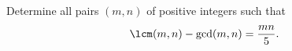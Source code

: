 Determine all pairs $(m, n)$ of positive integers such that
$$\lcm(m,n) - \gcd(m,n) = \frac{mn}{5}.$$